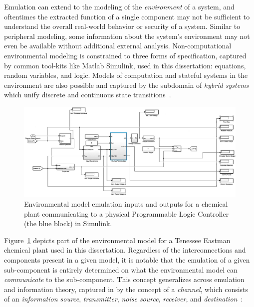 Emulation can extend to the modeling of the \emph{environment} of a system, and oftentimes the extracted function of a single component may not be sufficient to understand the overall real-world behavior or security of a system.
Similar to peripheral modeling, some information about the system's environment may not even be available without additional external analysis.
Non-computational environmental modeling is constrained to three forms of specification, captured by common tool-kits like Matlab Simulink, used in this dissertation: equations, random variables, and logic.
Models of computation and stateful systems in the environment are also possible and captured by the subdomain of \emph{hybrid systems} which unify discrete and continuous state transitions~\cite{henzinger1996theory}.

\begin{figure}
\centering
\includegraphics[width=\textwidth]{envir-model.pdf}
\caption{Environmental model emulation inputs and outputs for a chemical plant communicating to a physical Programmable Logic Controller (the blue block) in Simulink.}
\label{fig:envir-model}
\end{figure}

Figure~\ref{fig:envir-model} depicts part of the environmental model for a Tenessee Eastman chemical plant used in this dissertation.
Regardless of the interconnections and components present in a given model, it is notable that the emulation of a given sub-component is entirely determined on what the environmental model can \emph{communicate} to the sub-component.
This concept generalizes across emulation and information theory, captured in by the concept of a \emph{channel}, which consists of an \emph{information source}, \emph{transmitter}, \emph{noise source}, \emph{receiver}, and \emph{destination}~\cite{shannon1948mathematical}:

